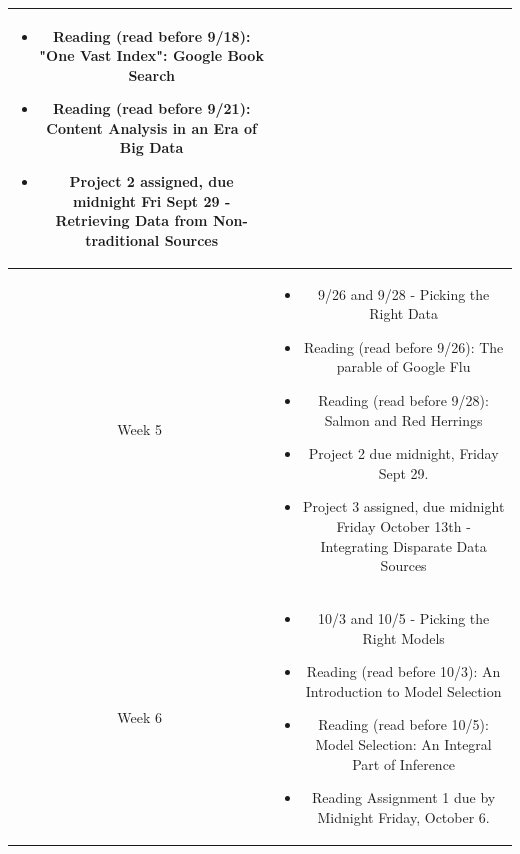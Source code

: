 \documentclass[11pt]{article}
\begin{document}
\begin{table}[h!]
\begin{tabular}{ | c | c | }
\begin{minipage}{.85\textwidth}
\begin{itemize}
	\item Reading (read before 9/18): "One Vast Index": Google Book Search 
	\item Reading (read before 9/21): Content Analysis in an Era of Big Data
		
	\item Project 2 assigned, due midnight Fri Sept 29 -  Retrieving Data from Non-traditional Sources
	\vspace{1mm}
\end{itemize}
\end{minipage} \\
\hline

Week 5 & \begin{minipage}{.85\textwidth}
\begin{itemize} \itemsep-0.4em
	\vspace{1mm}
	\item 9/26 and 9/28 - Picking the Right Data 
	
	\item Reading (read before 9/26): The parable of Google Flu
	\item Reading (read before 9/28): Salmon and Red Herrings
	
	\item Project 2 due midnight, Friday Sept 29.
	
	\item Project 3 assigned, due midnight Friday October 13th - Integrating Disparate Data Sources
	\vspace{1mm}
\end{itemize}
\end{minipage} \\
\hline


Week 6 & \begin{minipage}{.85\textwidth}
\begin{itemize} \itemsep-0.4em
	\vspace{1mm}
	\item 10/3 and 10/5 - Picking the Right Models

	\item Reading (read before 10/3): An Introduction to Model Selection
	\item Reading (read before 10/5): Model Selection: An Integral Part of Inference
	
	\item Reading Assignment 1 due by Midnight Friday, October 6.
	
	\vspace{1mm}
\end{itemize}
\end{minipage} \\
\hline


\end{tabular}
\end{table}
\end{document}
